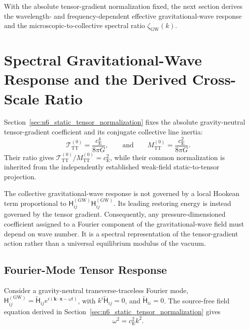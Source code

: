 With the absolute tensor-gradient normalization fixed, the next section derives the wavelength- and frequency-dependent effective gravitational-wave response and the microscopic-to-collective spectral ratio $\zeta_{\mathrm{GW}}(k)$.

\section{Spectral Gravitational-Wave Response and the Derived Cross-Scale Ratio}
\label{sec:n7_spectral_response}

Section~\ref{sec:n6_static_tensor_normalization} fixes the absolute gravity-neutral tensor-gradient coefficient and its conjugate collective line inertia:
\begin{equation}
    \mathcal{T}_{\mathrm{TT}}^{(0)} = \frac{c_{\mathrm{E}}^{4}}{8\pi G}, \qquad \text{and} \qquad M_{\mathrm{TT}}^{(0)} = \frac{c_{\mathrm{E}}^{2}}{8\pi G}.
\end{equation}
Their ratio gives $\mathcal{T}_{\mathrm{TT}}^{(0)} / M_{\mathrm{TT}}^{(0)} = c_{\mathrm{E}}^{2}$, while their common normalization is inherited from the independently established weak-field static-to-tensor projection.

The collective gravitational-wave response is not governed by a local Hookean term proportional to $\mathsf{H}_{ij}^{(\mathrm{GW})} \mathsf{H}_{ij}^{(\mathrm{GW})}$. Its leading restoring energy is instead governed by the tensor gradient. Consequently, any pressure-dimensioned coefficient assigned to a Fourier component of the gravitational-wave field must depend on wave number. It is a spectral representation of the tensor-gradient action rather than a universal equilibrium modulus of the vacuum.

\subsection{Fourier-Mode Tensor Response}
\label{subsec:n7_fourier_response}

Consider a gravity-neutral transverse-traceless Fourier mode, $\mathsf{H}_{ij}^{(\mathrm{GW})} = \widetilde{\mathsf{H}}_{ij} e^{i(\mathbf{k}\cdot\mathbf{x}-\omega t)}$, with $k^{i}\widetilde{\mathsf{H}}_{ij} = 0$, and $\widetilde{\mathsf{H}}_{ii} = 0$. The source-free field equation derived in Section~\ref{sec:n6_static_tensor_normalization} gives
\begin{equation}
    \omega^{2} = c_{\mathrm{E}}^{2}k^{2}.
    \label{eq:n7_gravity_neutral_dispersion}
\end{equation}

